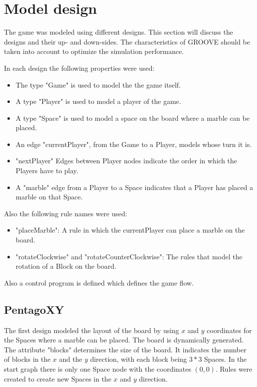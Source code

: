 \section{Model design}
\label{Design}
The game was modeled using different designs. This section will discuss the designs and their up- and down-sides.
The characteristics of GROOVE should be taken into account to optimize the simulation performance.

In each design the following properties were used:

\begin{itemize}
\item The type "Game" is used to model the the game itself.
\item A type "Player" is used to model a player of the game.
\item A type "Space" is used to model a space on the board where a marble can be placed.
\item An edge "currentPlayer", from the Game to a Player, models whose turn it is.
\item "nextPlayer" Edges between Player nodes indicate the order in which the Players have to play.
\item A "marble" edge from a Player to a Space indicates that a Player has placed a marble on that Space.
\end{itemize}

Also the following rule names were used:

\begin{itemize}
\item "placeMarble": A rule in which the currentPlayer can place a marble on the board.
\item "rotateClockwise" and "rotateCounterClockwise": The rules that model the rotation of a Block on the board.
\end{itemize}

Also a control program is defined which defines the game flow.

\subsection{PentagoXY}

The first design modeled the layout of the board by using $x$ and $y$ coordinates for the Spaces where a marble can be placed. 
The board is dynamically generated. The attribute "blocks" determines the size of the board. It indicates the number of blocks in the $x$ and the $y$ direction, with each block being $3*3$ Spaces.
In the start graph there is only one Space node with the coordinates $(0,0)$. Rules were created to create new Spaces in the $x$ and $y$ direction.

